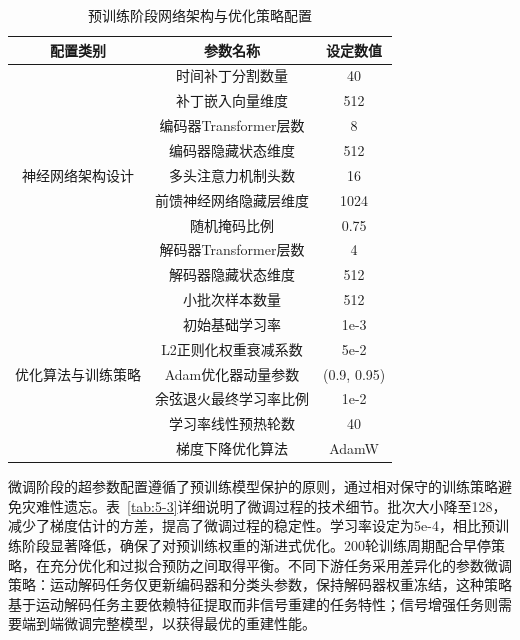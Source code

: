 \begin{table}[htbp]
\centering
\caption{预训练阶段网络架构与优化策略配置}
\label{tab:5-2}
\begin{tabular}{ccc}
\toprule
配置类别 & 参数名称 & 设定数值 \\
\midrule
\multirow{9}{*}{神经网络架构设计} & 时间补丁分割数量 & 40 \\
& 补丁嵌入向量维度 & 512 \\
& 编码器Transformer层数 & 8 \\
& 编码器隐藏状态维度 & 512 \\
& 多头注意力机制头数 & 16 \\
& 前馈神经网络隐藏层维度 & 1024 \\
& 随机掩码比例 & 0.75 \\
& 解码器Transformer层数 & 4 \\
& 解码器隐藏状态维度 & 512 \\
\midrule
\multirow{7}{*}{优化算法与训练策略} & 小批次样本数量 & 512 \\
& 初始基础学习率 & 1e-3 \\
& L2正则化权重衰减系数 & 5e-2 \\
& Adam优化器动量参数 & (0.9, 0.95) \\
& 余弦退火最终学习率比例 & 1e-2 \\
& 学习率线性预热轮数 & 40 \\
& 梯度下降优化算法 & AdamW \\
\bottomrule
\end{tabular}
\end{table}

微调阶段的超参数配置遵循了预训练模型保护的原则，通过相对保守的训练策略避免灾难性遗忘。表~\ref{tab:5-3}详细说明了微调过程的技术细节。批次大小降至128，减少了梯度估计的方差，提高了微调过程的稳定性。学习率设定为5e-4，相比预训练阶段显著降低，确保了对预训练权重的渐进式优化。200轮训练周期配合早停策略，在充分优化和过拟合预防之间取得平衡。不同下游任务采用差异化的参数微调策略：运动解码任务仅更新编码器和分类头参数，保持解码器权重冻结，这种策略基于运动解码任务主要依赖特征提取而非信号重建的任务特性；信号增强任务则需要端到端微调完整模型，以获得最优的重建性能。

